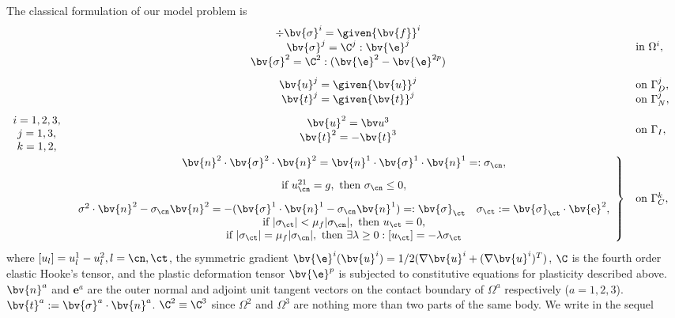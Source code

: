 The classical formulation of our model problem is
\begin{equation} \label{eq:ElPlContStrongFormDomainDecomposition}
\begin{array}{c}
         i=1,2,3, \\
         j=1,3, \\
         k=1,2,
      \end{array} 
  \begin{array}{cl}
   \begin{array}{c}
    \div \bv{\sigma}^i = \given{\bv{f}}^i \\
    \bv{\sigma}^j = \C^j:\bv{\e}^j \\
    \bv{\sigma}^2 = \C^2:(\bv{\e}^2 - \bv{\e}^{2p})
   \end{array}  &\mbox{in } \Omega^i, \\[5ex]
    \bv{u}^j = \given{\bv{u}}^j&\mbox{on }\Gamma_D^j, \\
    \bv{t}^j = \given{\bv{t}}^j&\mbox{on }\Gamma_N^j, \\[2ex]
   \begin{array}{c}
     \bv{u}^2 = \bv u^3      \\
     \bv{t}^{2} = -\bv{t}^3
   \end{array} & \mbox{on }\Gamma_I, \\[4ex]
\left. 
   \begin{array}{c}
 \bv{n}^{2} \cdot \bv{\sigma}^2 \cdot \bv{n}^{2} = \bv{n}^{1} \cdot \bv{\sigma}^1 \cdot \bv{n}^{1}=:\sigma_{\cn}, \\[2ex]
    \mbox{if } u^{21}_{\cn}=g, \mbox{ then } \sigma_{\cn} \leq 0, \\[2ex]
  \sigma^2 \cdot \bv{n}^{2} - \sigma_{\cn}\bv{n}^{2}
= - (\bv{\sigma}^{1} \cdot \bv{n}^{1} - \sigma_{\cn}\bv{n}^{1})=:\bv{\sigma}_{\ct} \quad \sigma_{\ct}:=\bv{\sigma}_{\ct}\cdot \bv{{\mathrm e}}^{2} , \\
    \mbox{if } |\sigma_{\ct}| < \mu_f |\sigma_\cn|, \mbox{ then } u_{\ct} = 0,\\
    \mbox{if } |\sigma_{\ct}| = \mu_f |\sigma_\cn|, \mbox{ then } \exists \lambda \geq 0: [u_{\ct}] = - \lambda \sigma_{\ct}
    \end{array} \right\rbrace &\mbox{on }\Gamma_C^k, \quad 
    \end{array}
\end{equation}
where $[u_l] = u^1_l - u^2_l, l=\cn,\ct$, the symmetric gradient $\bv{\e}^i(\bv{u}^i) = 1/2 (\nabla \bv{u}^i + (\nabla \bv{u}^i)^T )$, $\C$ is the fourth order elastic Hooke's tensor, and the plastic deformation tensor $\bv{\e}^p$ is subjected to constitutive equations for plasticity described above. $\bv{n}^{a}$ and $\mathbf{e}^{a}$ are the outer normal and adjoint unit tangent vectors on the contact boundary of $\Omega^{a}$ respectively ($a=1,2,3$). $\bv{t}^{a}:=\bv{\sigma}^{a}\cdot \bv{n}^{a}$. $\C^2\equiv \C^3$ since $\Omega^2$ and $\Omega^3$ are nothing more than two parts of the same body. We write in the sequel 
